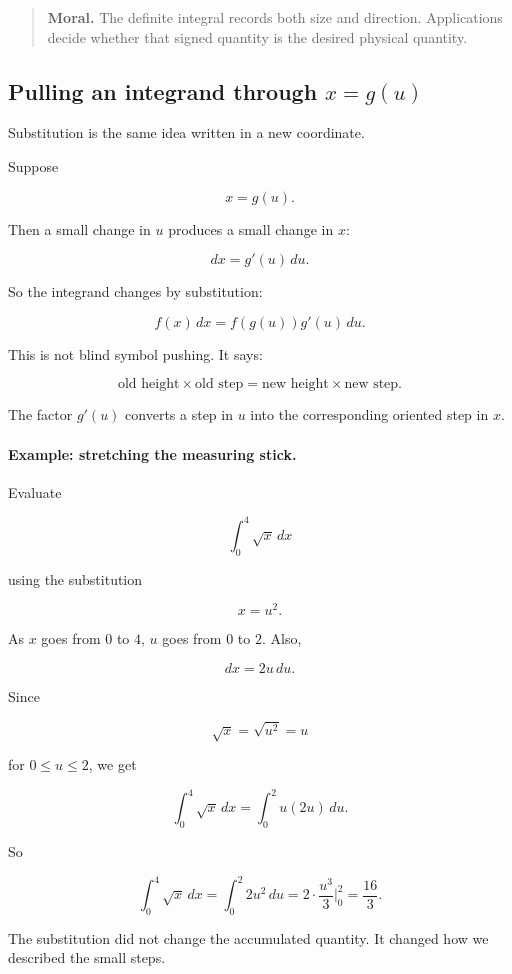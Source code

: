 \begin{quote}
\textbf{Moral.}
The definite integral records both size and direction.  Applications decide whether
that signed quantity is the desired physical quantity.
\end{quote}

\subsection{Pulling an integrand through \texorpdfstring{\(x=g(u)\)}{x=g(u)}}
\label{subsec:pulling-integrand-through-change}

Substitution is the same idea written in a new coordinate.

Suppose

\[
x=g(u).
\]

Then a small change in \(u\) produces a small change in \(x\):

\[
dx=g'(u)\,du.
\]

So the integrand changes by substitution:

\[
\boxed{
f(x)\,dx
=
f(g(u))g'(u)\,du.
}
\]

This is not blind symbol pushing.  It says:

\[
\text{old height}\times\text{old step}
=
\text{new height}\times\text{new step}.
\]

The factor \(g'(u)\) converts a step in \(u\) into the corresponding oriented step in
\(x\).

\paragraph{Example: stretching the measuring stick.}
Evaluate

\[
\int_0^4 \sqrt{x}\,dx
\]

using the substitution

\[
x=u^2.
\]

As \(x\) goes from \(0\) to \(4\), \(u\) goes from \(0\) to \(2\).  Also,

\[
dx=2u\,du.
\]

Since

\[
\sqrt{x}=\sqrt{u^2}=u
\]

for \(0\le u\le2\), we get

\[
\int_0^4 \sqrt{x}\,dx
=
\int_0^2 u(2u)\,du.
\]

So

\[
\int_0^4 \sqrt{x}\,dx
=
\int_0^2 2u^2\,du
=
2\cdot\frac{u^3}{3}\Big|_0^2
=
\frac{16}{3}.
\]

The substitution did not change the accumulated quantity.  It changed how we
described the small steps.

